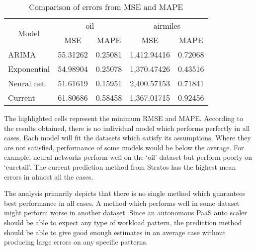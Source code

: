 \begin{table}[]
\centering
\caption{Comparison of errors from MSE and MAPE}
\label{my-label}
\begin{tabular}{|l|r|r|r|r|}
\hline
\multicolumn{1}{|c|}{\multirow{2}{*}{Model}} & \multicolumn{2}{c|}{oil}                             & \multicolumn{2}{c|}{airmiles}                        \\ \cline{2-5} 
\multicolumn{1}{|c|}{}                       & \multicolumn{1}{c|}{MSE} & \multicolumn{1}{c|}{MAPE} & \multicolumn{1}{c|}{MSE} & \multicolumn{1}{c|}{MAPE} \\ \hline
ARIMA                                        & 55.31262                 & 0.25081                   & 1,412.94416              & 0.72068                   \\ \hline
Exponential                                  & 54.98904                 & 0.25078                   & 1,370.47426              & 0.43516                   \\ \hline
Neural net.                                         & 51.61619                 & 0.15951                   & 2,400.57153              & 0.71841                   \\ \hline
Current                                      & 61.80686                 & 0.58458                   & 1,367.01715              & 0.92456                   \\ \hline
\end{tabular}
\end{table}

The highlighted cells represent the minimum RMSE and MAPE. According to the results obtained, there is no individual model which performs perfectly in all cases. Each model will fit the datasets which satisfy its assumptions. Where they are not satisfied, performance of some models would be below the average. For example, neural networks perform well on the ‘oil’ dataset but perform poorly on ‘euretail’. The current prediction method from Stratos has the highest mean errors in almost all the cases.

The analysis primarily depicts that there is no single method which guarantees best performance in all cases. A method which performs well in some dataset might perform worse in another dataset.
Since an autonomous PaaS auto scaler should be able to expect any type of workload pattern, the prediction method should be able to give good enough estimates in an average case without producing large errors on any specific patterns.

